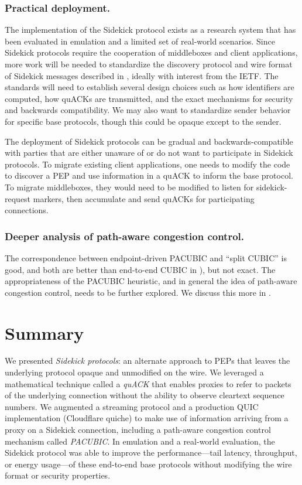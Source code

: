 \subsubsection{Practical deployment.}

The implementation of the Sidekick protocol exists as a research system that has
been evaluated in emulation and a limited set of real-world scenarios. Since
Sidekick protocols require the cooperation of middleboxes and client
applications, more work will be needed to standardize the discovery protocol
and wire format of Sidekick messages described in
, ideally with interest from the IETF. The
standards will need to establish several design choices such as how identifiers
are computed, how quACKs are transmitted, and the exact mechanisms for security
and backwards compatibility. We may also want to standardize sender behavior
for specific base protocols, though this could be opaque except to the sender.

The deployment of Sidekick protocols can be gradual and backwards-compatible
with parties that are either unaware of or do not want to participate in
Sidekick protocols.
To migrate existing client applications, one needs to modify the code to
discover a PEP and use information in a quACK to inform the base protocol.
To migrate middleboxes, they would need to be modified to listen for
sidekick-request markers, then accumulate and send quACKs for participating
connections.

\subsubsection{Deeper analysis of path-aware congestion control.}

The correspondence between endpoint-driven PACUBIC and ``split CUBIC'' is good,
and both are better than end-to-end CUBIC in ),
but not exact. The appropriateness of the PACUBIC heuristic, and in general the
idea of path-aware congestion control, needs to be further explored. We discuss
this more in .

\section{Summary}
\label{sec:sidekick:summary}

We presented \textit{Sidekick protocols}: an alternate approach to PEPs that
leaves the underlying protocol opaque and unmodified on the wire. We leveraged
a mathematical technique called a \textit{quACK} that enables proxies to refer
to packets of the underlying connection without the ability to observe
cleartext sequence numbers. We augmented a streaming protocol and a production
QUIC implementation (Cloudflare quiche) to make use of information arriving
from a proxy on a Sidekick connection, including a path-aware congestion control
mechanism called \textit{PACUBIC}. In emulation and a real-world evaluation,
the Sidekick protocol was able to improve the performance---tail latency,
throughput, or energy usage---of these end-to-end base protocols without
modifying the wire format or security properties.
